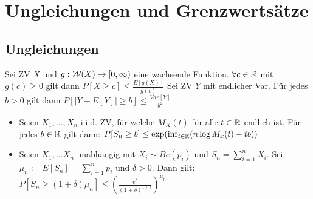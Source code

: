 
\section{Ungleichungen und Grenzwertsätze}
\subsection{Ungleichungen}
\begin{itemize}
     Sei ZV $X$ und $g: \mathcal{W}(X) \to [0, \infty)$ eine wachsende Funktion. $\forall c \in \mathbb{R}$ mit $g(c) \ge 0$ gilt dann $P[X \ge c] \le \frac{E[g(X)]}{g(c)}$
     Sei ZV $Y$ mit endlicher Var. Für jedes $b > 0$ gilt dann $P[|Y - E[Y]| \ge b] \le \frac{Var[Y]}{b^2}$
        \begin{itemize}
            \item Seien $X_1, \dots, X_n$ i.i.d. ZV, für welche $M_X(t)$ für alle $t \in \mathbb{R}$ endlich ist. Für jedes $b \in \mathbb{R}$ gilt dann: $P[S_n \ge b] \le \exp(\inf_{t \in \mathbb{R}} (n \log M_x(t) - tb))$
            \item Seien $X_1, \dots X_n$ unabhängig mit $X_i \sim Be(p_i)$ und $S_n = \sum_{i=1}^{n} X_i$. Sei $\mu_n := E[S_n] = \sum_{i=1}^{n} p_i$ und $\delta > 0$. Dann gilt: $P[S_n \ge (1 + \delta) \mu_n] \le (\frac{e^\delta}{(1 + \delta)^{1 + \delta}})^{\mu_n}$
        \end{itemize}
\end{itemize}

